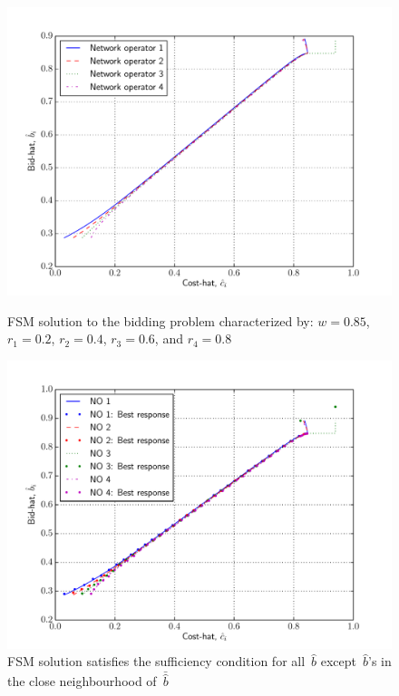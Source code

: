 \begin{figure}[p!]
  \includegraphics[width=\figsize]{Indirect/Figures/forward_shooting_4}
  \caption{FSM solution to the bidding problem characterized by: $w=0.85$, $r_1 = 0.2$, $r_2 = 0.4$, $r_3 = 0.6$, and $r_4=0.8$}
  \label{fig:forward_shooting_4_indirect}
  \vspace{10mm}
  \includegraphics[width=\figsize]{Indirect/Figures/forward_shooting_4_sufficiency}
  \caption{FSM solution satisfies the sufficiency condition for all~$\hat{b}$ except~$\hat{b}$'s in the close neighbourhood of~$\bar{\hat{b}}$}
  \label{fig:forward_shooting_4_sufficiency_indirect}
\end{figure}

